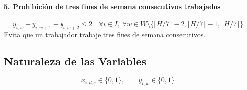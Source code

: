\documentclass[a4paper,12pt]{article}
\begin{document}
	\paragraph{5. Prohibición de tres fines de semana consecutivos trabajados}
	\[
	y_{i,w} + y_{i,w+1} + y_{i,w+2} \le 2 
	\quad \forall i \in I, \; \forall w \in W \setminus \{\lfloor H/7 \rfloor -2, \lfloor H/7 \rfloor -1, \lfloor H/7 \rfloor\}
	\]
	Evita que un trabajador trabaje tres fines de semana consecutivos.
	
	\subsection*{Naturaleza de las Variables}
	\[
	x_{i,d,s} \in \{0,1\}, \qquad y_{i,w} \in \{0,1\}
	\]
	
\end{document}
